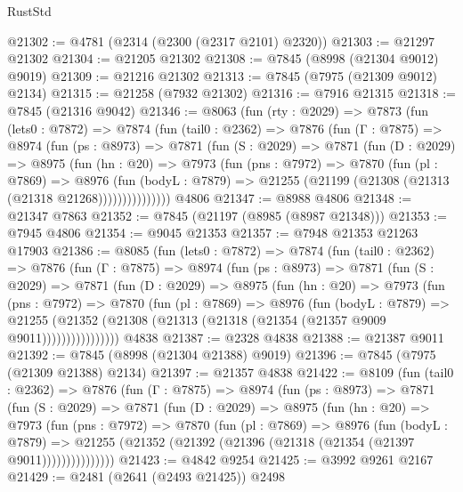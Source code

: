 \begin{lexlean}{RustStd}
\begin{coremodule}
@21302 := @4781 (@2314 (@2300 (@2317 @2101) @2320))
@21303 := @21297 @21302
@21304 := @21205 @21302
@21308 := @7845 (@8998 (@21304 @9012) @9019)
@21309 := @21216 @21302
@21313 := @7845 (@7975 (@21309 @9012) @2134)
@21315 := @21258 (@7932 @21302)
@21316 := @7916 @21315
@21318 := @7845 (@21316 @9042)
@21346 := @8063
    (fun (rty : @2029) =>
    @7873
      (fun (lets0 : @7872) =>
      @7874
        (fun (tail0 : @2362) =>
        @7876
          (fun (Γ : @7875) =>
          @8974
            (fun (ps : @8973) =>
            @7871
              (fun (S : @2029) =>
              @7871
                (fun (D : @2029) =>
                @8975
                  (fun (hn : @20) =>
                  @7973
                    (fun (pns : @7972) =>
                    @7870
                      (fun (pl : @7869) =>
                      @8976
                        (fun (bodyL : @7879) =>
                        @21255 (@21199 (@21308 (@21313 (@21318 @21268)))))))))))))))
    @4806
@21347 := @8988 @4806
@21348 := @21347 @7863
@21352 := @7845 (@21197 (@8985 (@8987 @21348)))
@21353 := @7945 @4806
@21354 := @9045 @21353
@21357 := @7948 @21353 @21263 @17903
@21386 := @8085
    (fun (lets0 : @7872) =>
    @7874
      (fun (tail0 : @2362) =>
      @7876
        (fun (Γ : @7875) =>
        @8974
          (fun (ps : @8973) =>
          @7871
            (fun (S : @2029) =>
            @7871
              (fun (D : @2029) =>
              @8975
                (fun (hn : @20) =>
                @7973
                  (fun (pns : @7972) =>
                  @7870
                    (fun (pl : @7869) =>
                    @8976
                      (fun (bodyL : @7879) =>
                      @21255
                        (@21352 (@21308 (@21313 (@21318 (@21354 (@21357 @9009 @9011))))))))))))))))
    @4838
@21387 := @2328 @4838
@21388 := @21387 @9011
@21392 := @7845 (@8998 (@21304 @21388) @9019)
@21396 := @7845 (@7975 (@21309 @21388) @2134)
@21397 := @21357 @4838
@21422 := @8109
    (fun (tail0 : @2362) =>
    @7876
      (fun (Γ : @7875) =>
      @8974
        (fun (ps : @8973) =>
        @7871
          (fun (S : @2029) =>
          @7871
            (fun (D : @2029) =>
            @8975
              (fun (hn : @20) =>
              @7973
                (fun (pns : @7972) =>
                @7870
                  (fun (pl : @7869) =>
                  @8976
                    (fun (bodyL : @7879) =>
                    @21255 (@21352 (@21392 (@21396 (@21318 (@21354 (@21397 @9011)))))))))))))))
@21423 := @4842 @9254
@21425 := @3992 @9261 @2167
@21429 := @2481 (@2641 (@2493 @21425)) @2498

\end{coremodule}
\end{lexlean}
